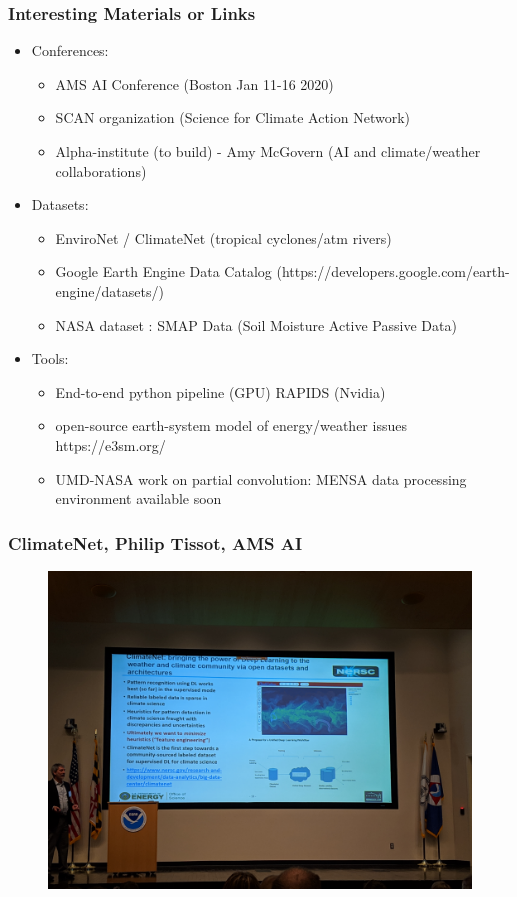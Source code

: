 \documentclass{beamer}
\begin{document}
\begin{frame}
\frametitle{Interesting Materials or Links}

\begin{itemize}
	\item Conferences: 
	\begin{itemize}
	\item AMS AI Conference (Boston Jan 11-16 2020)
	\item SCAN organization (Science for Climate Action Network)
	\item Alpha-institute (to build) - Amy McGovern (AI and climate/weather collaborations)
\end{itemize}		
	\item Datasets: 
	\begin{itemize}
	\item EnviroNet / ClimateNet (tropical cyclones/atm rivers)
	\item Google Earth Engine Data Catalog (https://developers.google.com/earth-engine/datasets/)
	\item NASA dataset : SMAP Data (Soil Moisture Active Passive Data)
	\end{itemize}		
	
	\item Tools: 
	\begin{itemize}
	\item End-to-end python pipeline (GPU) RAPIDS (Nvidia)
	\item open-source earth-system model of energy/weather issues https://e3sm.org/
	\item UMD-NASA work on partial convolution: MENSA data processing environment available soon
	\end{itemize}
	
\end{itemize}
\end{frame}


\begin{frame}
\frametitle{ClimateNet, Philip Tissot, AMS AI}
\begin{figure}
	\includegraphics[width=\linewidth]{figs/IMG_20190423_105340.jpg}
\end{figure}
\end{frame}
\end{document}
